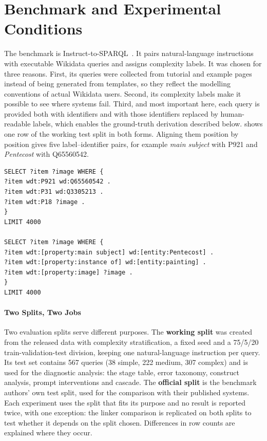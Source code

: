 \section{Benchmark and Experimental
Conditions}

\label{sec:method-pipeline}
\label{sec:setup-benchmark}

The benchmark is Instruct-to-SPARQL~\parencite{benamor2025instruct}.
It pairs natural-language instructions with executable Wikidata queries and assigns complexity labels.
It was chosen for three reasons.
First, its queries were collected from tutorial and example pages instead of being generated from templates, so they reflect the modelling conventions of actual Wikidata users.
Second, its complexity labels make it possible to see where systems fail.
Third, and most important here, each query is provided both with identifiers and with those identifiers replaced by human-readable labels, which enables the ground-truth derivation described below.
 shows one row of the working test split in both forms.
Aligning them position by position gives five label--identifier pairs, for example \emph{main subject} with P921 and \emph{Pentecost} with Q65560542.

\begin{lstlisting}[language=SPARQL,caption={One benchmark row (working test split, row 1938, complexity \emph{simple}), for the instruction ``Find paintings depicting the Pentecost theme.'' Top: the executable reference query. Bottom: the annotated form, in which every identifier is replaced by its label (prefix declarations omitted).},label={lst:dataset-example},captionpos=b,float=tbp]
SELECT ?item ?image WHERE {
?item wdt:P921 wd:Q65560542 .
?item wdt:P31 wd:Q3305213 .
?item wdt:P18 ?image .
}
LIMIT 4000

SELECT ?item ?image WHERE {
?item wdt:[property:main subject] wd:[entity:Pentecost] .
?item wdt:[property:instance of] wd:[entity:painting] .
?item wdt:[property:image] ?image .
}
LIMIT 4000
\end{lstlisting}

\paragraph{Two Splits, Two Jobs}

Two evaluation splits serve different purposes.
The \textbf{working split} was created from the released data with complexity stratification, a fixed seed and a 75/5/20 train-validation-test division, keeping one natural-language instruction per query.
Its test set contains 567 queries (38 simple, 222 medium, 307 complex) and is used for the diagnostic analysis: the stage table, error taxonomy, construct analysis, prompt interventions and cascade.
The \textbf{official split} is the benchmark authors' own test split, used for the comparison with their published systems.
Each experiment uses the split that fits its purpose and no result is reported twice, with one exception: the linker comparison is replicated on both splits to test whether it depends on the split chosen.
Differences in row counts are explained where they occur.

